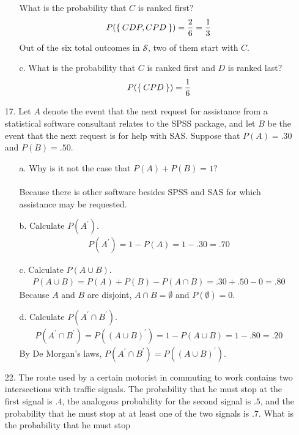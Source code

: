 \documentclass[letterpaper,12pt]{article}
\begin{document}
\begin{enumerate}
\begin{enumerate}
        What is the probability that $C$ is ranked first?
        \begin{align*}
          P(\Set{CDP, CPD}) = \frac{2}{6} = \frac{1}{3}
        \end{align*}
        Out of the six total outcomes in $\mathcal{S}$, two of them start with $C$.
      \item[c.]
        What is the probability that $C$ is ranked first and $D$ is ranked last?
        \begin{align*}
          P(\Set{CPD}) = \frac{1}{6}
        \end{align*}
    \end{enumerate}
  \item[17.]
  Let $A$ denote the event that the next request for assistance from a statistical software consultant relates to the SPSS package, and let $B$ be the event that the next request is for help with SAS. Suppose that $P(A) = .30$ and $P(B) = .50$.
  \begin{enumerate}
      \item[a.]
        Why is it not the case that $P(A) + P(B) = 1$?
        \\ \\
        Because there is other software besides SPSS and SAS for which assistance may be requested.
      \item[b.]
        Calculate $P(A^\prime)$.
        \begin{align*}
          P(A^\prime) = 1 - P(A) = 1 - .30 = .70
        \end{align*}
      \item[c.]
        Calculate $P(A\cup B)$.
        \begin{align*}
          P(A \cup B) = P(A) + P(B) - P(A \cap B) = .30 + .50 - 0 = .80
        \end{align*}
        Because $A$ and $B$ are disjoint, $A \cap B = \emptyset$ and $P(\emptyset) = 0$.
      \item[d.]
        Calculate $P(A^\prime \cap B^\prime)$.
        \begin{align*}
          P(A^\prime \cap B^\prime) = P((A \cup B)^\prime) = 1 - P(A \cup B) = 1 - .80 = .20
        \end{align*}
        By De Morgan's laws, $P(A^\prime \cap B^\prime) = P((A \cup B)^\prime)$.
    \end{enumerate}
  \item[22.]
    The route used by a certain motorist in commuting to work contains two intersections with traffic signals. The probability that he must stop at the first signal is $.4$, the analogous probability for the second signal is $.5$, and the probability that he must stop at at least one of the two signals is $.7$. What is the probability that he must stop

\end{enumerate}
\end{document}
